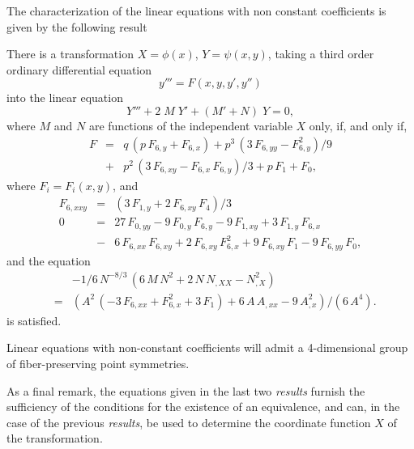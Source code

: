 The characterization of the linear equations with non constant coefficients 
is given by the following result
\begin{re}
There is a transformation $X=\phi(x)$, $Y=\psi(x,y)$, taking 
a third order ordinary differential equation 
\begin{equation}
y'''=F(x,y,y',y'')
\end{equation}
into the linear equation 
\begin{equation}
Y'''+2\;M\;Y'+(M'+N)\;Y=0,
\end{equation}
where $M$ and $N$ are functions of the independent variable $X$ only, 
if, and only if, 
\begin{eqnarray}
F&=&q\,(p\,F_{6,y} + F_{6,x}) + p^{3}\,(3\,F_{6,yy} - F_{6,y}^{2})/9 
\nonumber \\
&+& p^{2}\,(3\,F_{6,xy} - F_{6,x}\,F_{6,y})/3 + p\,F_{1} + F_{0},
\end{eqnarray}
where $F_{i}=F_{i}(x,y)$, and 
\begin{eqnarray}
F_{6,xxy}&=& (3\,F_{1,y} + 2\,F_{6,xy}\,F_{4})/3 \\
0&=&27\,F_{0,yy} - 9\,F_{0,y}\,F_{6,y} - 9\,F_{1,xy} + 3\,F_{1,y}\,F_{6,x} 
\nonumber \\
&-& 6\,F_{6,xx}\,F_{6,xy} + 2\,F_{6,xy}\,F_{6,x}^{2} + 9\,F_{6,xy}\,F_{1} 
- 9\,F_{6,yy}\,F_{0},
\end{eqnarray}
and the equation
\begin{equation}
\begin{array}{lll}
& &-1/6\,N^{-8/3}\,(6\,M\,N^{2}+2\,N\,N_{,XX}-N_{,X}^{2}) \\
&=&(A^{2}\,( - 3\,F_{6,xx} + F_{6,x}^{2} + 3\,F_{1}) 
+ 6\,A\,A_{,xx} - 9\,A_{,x}^{2})/(6\,A^{4}).
\end{array}
\end{equation}
is satisfied.
\end{re}

Linear equations with non-constant coefficients will admit a 4-dimensional 
group of fiber-preserving point symmetries.


As a final remark, the equations given in the last two {\it results} 
furnish the sufficiency of the conditions for the existence of an 
equivalence, and can, in the case of the 
previous {\it results}, be used to determine the coordinate function $X$ 
of the transformation.

